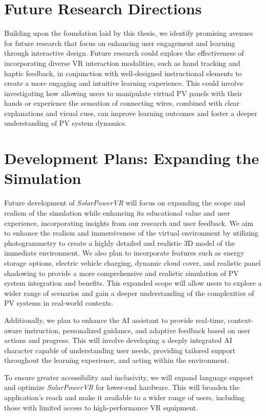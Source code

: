 \documentclass[draft, final]{vutinfth} %
\begin{document}
\section{Future Research Directions}

Building upon the foundation laid by this thesis, we identify promising avenues for future research that focus on enhancing user engagement and learning through interactive design. Future research could explore the effectiveness of incorporating diverse VR interaction modalities, such as hand tracking and haptic feedback, in conjunction with well-designed instructional elements to create a more engaging and intuitive learning experience. This could involve investigating how allowing users to manipulate virtual PV panels with their hands or experience the sensation of connecting wires, combined with clear explanations and visual cues, can improve learning outcomes and foster a deeper understanding of PV system dynamics.

\section{Development Plans: Expanding the Simulation}

Future development of \textit{SolarPowerVR} will focus on expanding the scope and realism of the simulation while enhancing its educational value and user experience, incorporating insights from our research and user feedback.  We aim to enhance the realism and immersiveness of the virtual environment by utilizing photogrammetry to create a highly detailed and realistic 3D model of the immediate environment. We also plan to incorporate features such as energy storage options, electric vehicle charging, dynamic cloud cover, and realistic panel shadowing to provide a more comprehensive and realistic simulation of PV system integration and benefits. This expanded scope will allow users to explore a wider range of scenarios and gain a deeper understanding of the complexities of PV systems in real-world contexts. 

Additionally, we plan to enhance the AI assistant to provide real-time, context-aware instruction, personalized guidance, and adaptive feedback based on user actions and progress. This will involve developing a deeply integrated AI character capable of understanding user needs, providing tailored support throughout the learning experience, and acting within the environment. 

To ensure greater accessibility and inclusivity, we will expand language support and optimize \textit{SolarPowerVR} for lower-end hardware. This will broaden the application's reach and make it available to a wider range of users, including those with limited access to high-performance VR equipment.
\end{document}
